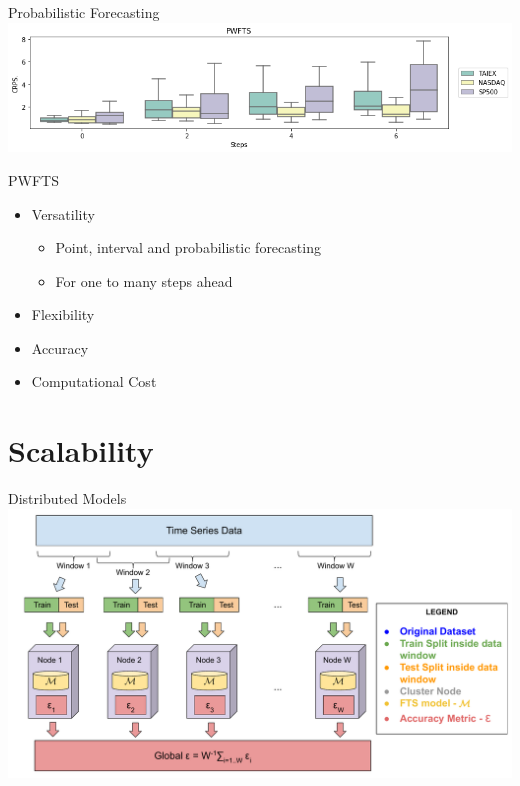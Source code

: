 \documentclass{beamer}
\begin{document}
\begin{frame}{Probabilistic Forecasting}
\includegraphics[width=\textwidth]{figures/pwfts_ahead_probabilistic.png}
\end{frame}

\begin{frame}{PWFTS}
\linespread{2}
\begin{itemize}
    \item Versatility
    \begin{itemize}
        \item Point, interval and probabilistic forecasting
        \item For one to many steps ahead
    \end{itemize}
    \item Flexibility
    \item Accuracy
    \item Computational Cost
\end{itemize}
\end{frame}

\section{Scalability}

\begin{frame}{Distributed Models}
\includegraphics[width=\textwidth]{figures/distributed_testing.pdf}
\end{frame}
\end{document}
